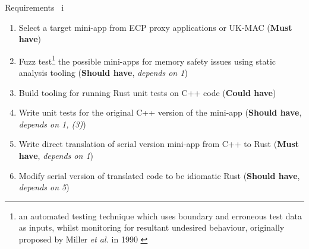 \documentclass[10pt,aspectratio=169]{beamer}
\newcommand{\cmark}{\ding{51}}
\newcommand{\done}{\rlap{$\square$}{\raisebox{2pt}{\large\hspace{1pt}\textcolor{green}{\cmark}}}\hspace{-2.5pt}}
\begin{document}
\begin{frame}{Requirements \ i}
    \begin{enumerate}
        \item[\done\ \ 1.]
          Select a target mini-app from ECP proxy applications or UK-MAC
          (\textbf{Must have})
        \item[\done\ \ 2.]
          Fuzz test\footnote{an automated testing technique which uses boundary and erroneous test data as inputs, whilst monitoring for resultant undesired behaviour, originally proposed by Miller \textit{et al.} in 1990 \cite{millerEmpiricalStudyReliability1990}\cite{liangFuzzingStateArt2018}} the possible mini-apps for memory safety issues using static analysis tooling \cite{stepanovMemorySanitizerFastDetector2015}
          (\textbf{Should have}, \textit{depends on 1})
        \item[\done\ \ 3.]
          Build tooling for running Rust unit tests on C++ code
          (\textbf{Could have})
        \item[\done\ \ 4.]
          Write unit tests for the original C++ version of the
          mini-app
          (\textbf{Should have}, \textit{depends on 1, (3)})
        \item[\done\ \ 5.]
          Write direct translation of serial version mini-app from C++ to Rust
          (\textbf{Must have}, \textit{depends on 1})
        \item[\done\ \ 6.]
          Modify serial version of translated code to be idiomatic Rust \cite{endlerMreIdiomaticrust2023} 
          (\textbf{Should have}, \textit{depends on 5})
    \end{enumerate}
\end{frame}
\end{document}
